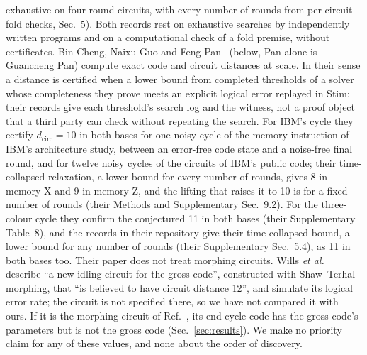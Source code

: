 \documentclass[aps,pra,twocolumn,superscriptaddress,nofootinbib,longbibliography,floatfix]{revtex4-2}
\newcommand{\dc}{d_{\mathrm{circ}}}
\begin{document}
exhaustive on four-round circuits, with every number of rounds from per-circuit fold checks, Sec.~5). Both records rest on exhaustive searches by independently written programs and on a computational check of a fold premise, without certificates. Bin Cheng, Naixu Guo and Feng Pan~\cite{cheng2026certifying} (below, Pan alone is Guancheng Pan) compute exact code and circuit distances at scale. In their sense a distance is certified when a lower bound from completed thresholds of a solver whose completeness they prove meets an explicit logical error replayed in Stim; their records give each threshold's search log and the witness, not a proof object that a third party can check without repeating the search. For IBM's cycle they certify $\dc=10$ in both bases for one noisy cycle of the memory instruction of IBM's architecture study, between an error-free code state and a noise-free final round, and for twelve noisy cycles of the circuits of IBM's public code; their time-collapsed relaxation, a lower bound for every number of rounds, gives 8 in memory-X and 9 in memory-Z, and the lifting that raises it to 10 is for a fixed number of rounds (their Methods and Supplementary Sec.~9.2). For the three-colour cycle they confirm the conjectured 11 in both bases (their Supplementary Table~8), and the records in their repository give their time-collapsed bound, a lower bound for any number of rounds (their Supplementary Sec.~5.4), as 11 in both bases too. Their paper does not treat morphing circuits. Wills \textit{et al.}~\cite{wills2026concatenating} describe ``a new idling circuit for the gross code'', constructed with Shaw--Terhal morphing, that ``is believed to have circuit distance 12'', and simulate its logical error rate; the circuit is not specified there, so we have not compared it with ours. If it is the morphing circuit of Ref.~\cite{shaw2024lowering}, its end-cycle code has the gross code's parameters but is not the gross code (Sec.~\ref{sec:results}). We make no priority claim for any of these values, and none about the order of discovery.
\end{document}
